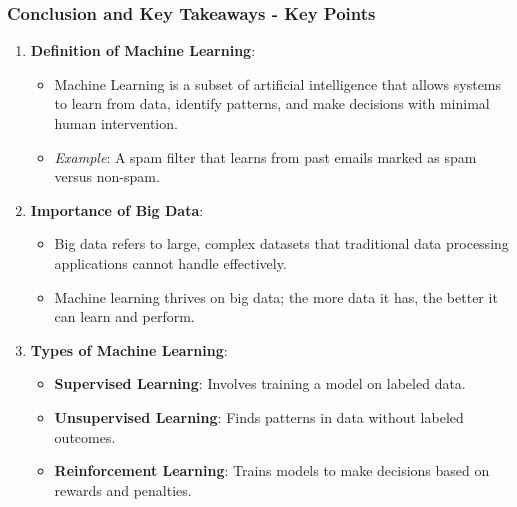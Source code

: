 \documentclass[aspectratio=169]{beamer}
\begin{document}
\begin{frame}[fragile]
    \frametitle{Conclusion and Key Takeaways - Key Points}
    \begin{enumerate}
        \item \textbf{Definition of Machine Learning}:
        \begin{itemize}
            \item Machine Learning is a subset of artificial intelligence that allows systems to learn from data, identify patterns, and make decisions with minimal human intervention.
            \item \textit{Example}: A spam filter that learns from past emails marked as spam versus non-spam.
        \end{itemize}

        \item \textbf{Importance of Big Data}:
        \begin{itemize}
            \item Big data refers to large, complex datasets that traditional data processing applications cannot handle effectively.
            \item Machine learning thrives on big data; the more data it has, the better it can learn and perform.
        \end{itemize}

        \item \textbf{Types of Machine Learning}:
        \begin{itemize}
            \item \textbf{Supervised Learning}: Involves training a model on labeled data.
            \item \textbf{Unsupervised Learning}: Finds patterns in data without labeled outcomes.
            \item \textbf{Reinforcement Learning}: Trains models to make decisions based on rewards and penalties.
        \end{itemize}
    \end{enumerate}
\end{frame}
\end{document}
